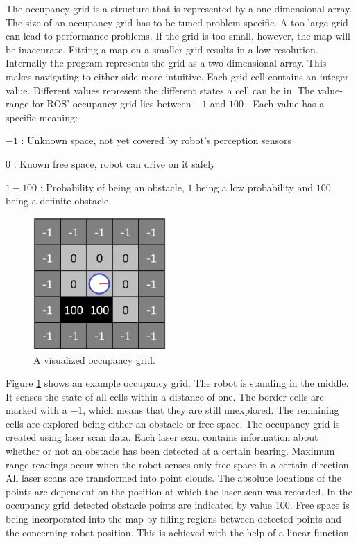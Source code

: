 \documentclass{ba-kecs}
\begin{document}
The occupancy grid is a structure that is represented by a one-dimensional array. The size of an occupancy grid has to be tuned problem specific. A too large grid can lead to performance problems. If the grid is too small, however, the map will be inaccurate. Fitting a map on a smaller grid results in a low resolution.
Internally the program represents the grid as a two dimensional array. This makes navigating to either side more intuitive. Each grid cell contains an integer value. Different values represent the different states a cell can be in. The value-range for ROS' occupancy grid lies between $-1$ and $100$ \cite{occupancy}. Each value has a specific meaning:
\begin{description}
\item{$-1$} : Unknown space, not yet covered by robot's perception sensors
\item{$0$} : Known free space, robot can drive on it safely
\item{$1-100$} : Probability of being an obstacle, $1$ being a low probability and $100$ being a definite obstacle.
\end{description}
\begin{figure}[htbp]
	\centering
		\includegraphics[width=0.45\textwidth]{figures/Occup.png}
	\caption{A visualized occupancy grid.}
	\label{fig:Occupancy}
\end{figure}
Figure \ref{fig:Occupancy} shows an example occupancy grid. The robot is standing in the middle. It senses the state of all cells within a distance of one. The border cells are marked with a $-1$, which means that they are still unexplored. The remaining cells are explored being either an obstacle or free space.
The occupancy grid is created using laser scan data. Each laser scan contains information about whether or not an obstacle has been detected at a certain bearing. Maximum range readings occur when the robot senses only free space in a certain direction. All laser scans are transformed into point clouds. The absolute locations of the points are dependent on the position at which the laser scan was recorded.
In the occupancy grid detected obstacle points are indicated by value 100.
Free space is being incorporated into the map by filling regions between detected points and the concerning robot position. This is achieved with the help of a linear function. 
\end{document}
